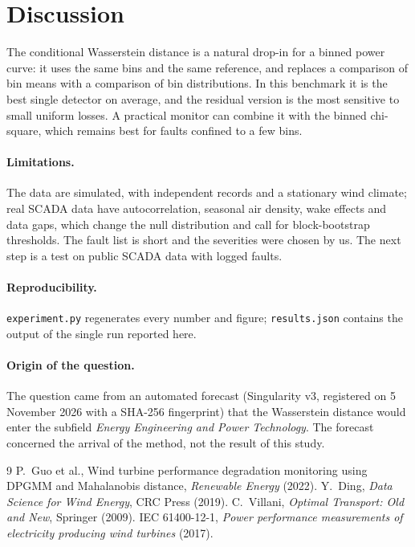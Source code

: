 \documentclass[11pt]{article}
\begin{document}
\section{Discussion}
The conditional Wasserstein distance is a natural drop-in for a binned power curve: it uses the same bins and the same
reference, and replaces a comparison of bin means with a comparison of bin distributions. In this benchmark it is the
best single detector on average, and the residual version is the most sensitive to small uniform losses. A practical
monitor can combine it with the binned chi-square, which remains best for faults confined to a few bins.

\paragraph{Limitations.} The data are simulated, with independent records and a stationary wind climate; real SCADA
data have autocorrelation, seasonal air density, wake effects and data gaps, which change the null distribution and
call for block-bootstrap thresholds. The fault list is short and the severities were chosen by us. The next step is a
test on public SCADA data with logged faults.

\paragraph{Reproducibility.} \texttt{experiment.py} regenerates every number and figure; \texttt{results.json}
contains the output of the single run reported here.

\paragraph{Origin of the question.} The question came from an automated forecast (Singularity v3, registered on 5
November 2026 with a SHA-256 fingerprint) that the Wasserstein distance would enter the subfield \emph{Energy
Engineering and Power Technology}. The forecast concerned the arrival of the method, not the result of this study.

\begin{thebibliography}{9}
 P.~Guo et al., Wind turbine performance degradation monitoring using DPGMM and Mahalanobis distance,
\emph{Renewable Energy} (2022).
 Y.~Ding, \emph{Data Science for Wind Energy}, CRC Press (2019).
 C.~Villani, \emph{Optimal Transport: Old and New}, Springer (2009).
 IEC 61400-12-1, \emph{Power performance measurements of electricity producing wind turbines} (2017).
\end{thebibliography}
\end{document}
